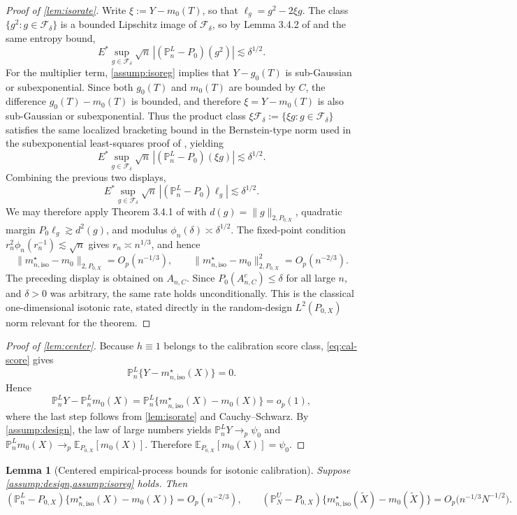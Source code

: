 \documentclass{article}
\theoremstyle{plain}
\newtheorem{lemma}{Lemma}
\theoremstyle{definition}
\newcommand{\E}{\mathbb{E}}
\newcommand{\1}{\mathbbm{1}}
\newcommand{\Pl}{\mathbb{P}^{L}_n}
\newcommand{\Pu}{\mathbb{P}^{U}_N}
\newcommand{\Px}{P_{0,X}}
\begin{document}
\begin{proof}[Proof of \cref{lem:isorate}]
Write \(\xi:=Y-m_0(T)\), so that \(\ell_g=g^2-2\xi g\). The class \(\{g^2:g\in\mathcal F_\delta\}\) is a bounded Lipschitz image of \(\mathcal F_\delta\), so by Lemma 3.4.2 of \citet{vdvwellner1996} and the same entropy bound,
\[
E^*\sup_{g\in\mathcal F_\delta}\sqrt{n}\,|(\Pl-P_0)(g^2)|
\lesssim
\delta^{1/2}.
\]
For the multiplier term, \cref{assump:isoreg} implies that \(Y-g_0(T)\) is sub-Gaussian or subexponential. Since both \(g_0(T)\) and \(m_0(T)\) are bounded by \(C\), the difference \(g_0(T)-m_0(T)\) is bounded, and therefore \(\xi=Y-m_0(T)\) is also sub-Gaussian or subexponential. Thus the product class \(\xi\mathcal F_\delta:=\{\xi g:g\in\mathcal F_\delta\}\) satisfies the same localized bracketing bound in the Bernstein-type norm used in the subexponential least-squares proof of \citet{Bibaut2019}, yielding
\[
E^*\sup_{g\in\mathcal F_\delta}\sqrt{n}\,|(\Pl-P_0)(\xi g)|
\lesssim
\delta^{1/2}.
\]
Combining the previous two displays,
\[
E^*\sup_{g\in\mathcal F_\delta}\sqrt{n}\,|(\Pl-P_0)\ell_g|
\lesssim
\delta^{1/2}.
\]
We may therefore apply Theorem 3.4.1 of \citet{vdvwellner1996} with \(d(g)=\|g\|_{2,\Px}\), quadratic margin \(P_0\ell_g\gtrsim d^2(g)\), and modulus \(\phi_n(\delta)\asymp\delta^{1/2}\). The fixed-point condition \(r_n^2\phi_n(r_n^{-1})\lesssim \sqrt n\) gives \(r_n\asymp n^{1/3}\), and hence
\[
\|m_{n,\mathrm{iso}}^\star-m_0\|_{2,\Px}=O_p(n^{-1/3}),
\qquad
\|m_{n,\mathrm{iso}}^\star-m_0\|_{2,\Px}^2=O_p(n^{-2/3}).
\]
The preceding display is obtained on \(A_{n,C}\). Since \(P_0(A_{n,C}^c)\le \delta\) for all large \(n\), and \(\delta>0\) was arbitrary, the same rate holds unconditionally. This is the classical one-dimensional isotonic rate, stated directly in the random-design \(L^2(\Px)\) norm relevant for the theorem.
\end{proof}

\begin{proof}[Proof of \cref{lem:center}]
Because \(h\equiv 1\) belongs to the calibration score class, \cref{eq:cal-score} gives
\[
\Pl\{Y-m_{n,\mathrm{iso}}^\star(X)\}=0.
\]
Hence
\[
\Pl Y-\Pl m_0(X)=\Pl\{m_{n,\mathrm{iso}}^\star(X)-m_0(X)\}=o_p(1),
\]
where the last step follows from \cref{lem:isorate} and Cauchy--Schwarz. By \cref{assump:design}, the law of large numbers yields \(\Pl Y\to_p \psi_0\) and \(\Pl m_0(X)\to_p \E_{\Px}[m_0(X)]\). Therefore \(\E_{\Px}[m_0(X)]=\psi_0\).
\end{proof}

\begin{lemma}[Centered empirical-process bounds for isotonic calibration]
\label{lem:eprate}
Suppose \cref{assump:design,assump:isoreg} holds. Then
\[
(\Pl-\Px)\{m_{n,\mathrm{iso}}^\star(X)-m_0(X)\}=O_p(n^{-2/3}),
\qquad
(\Pu-\Px)\{m_{n,\mathrm{iso}}^\star(\widetilde X)-m_0(\widetilde X)\}=O_p\bigl(n^{-1/3}N^{-1/2}\bigr).
\]
\end{lemma}
\end{document}
